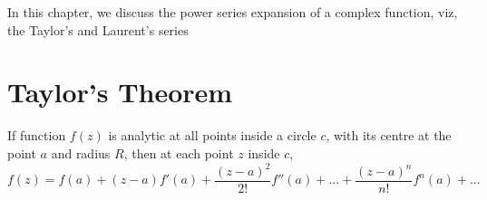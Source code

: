In this chapter, we discuss the power series expansion of a complex function, viz,  the Taylor's and Laurent's series
\section{Taylor's Theorem}
\begin{theorem}
If function $f(z)$ is analytic at all points inside a circle $c$, with its centre at the point $a$ and radius $R$, then at each point $z$ inside $c$,
\[f(z) = f(a) + (z-a)f'(a) + \frac{(z-a)^2}{2!}f''(a) + ... + \frac{(z-a)^n}{n!}f^n(a) + ...\]
\end{theorem}

